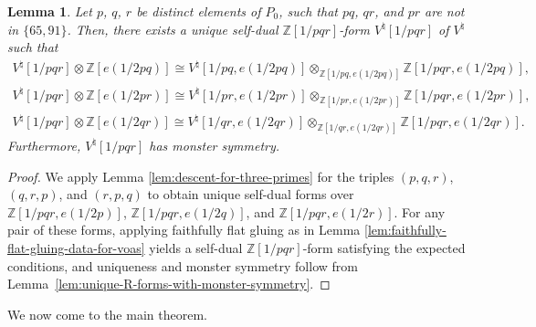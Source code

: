 \documentclass[pdftex]{sigma}
\newcommand{\bZ}{\mathbb{Z}}
\newtheorem{lem}[thm]{Lemma}
\theoremstyle{definition}
\begin{document}
\begin{lem} \label{lem:descent-for-triangle}Let $p$, $q$, $r$ be distinct elements of $P_0$, such that $pq$, $qr$, and $pr$ are not in $\{65, 91 \}$. Then, there exists a unique self-dual $\bZ[1/pqr]$-form $V^\natural[1/pqr]$ of $V^\natural$ such that
 \begin{gather*}
V^\natural[1/pqr] \otimes \bZ[e(1/2pq)] \cong V^\natural[1/pq, e(1/2pq)] \otimes_{\bZ[1/pq, e(1/2pq)]} \bZ[1/pqr, e(1/2pq)], \\
V^\natural[1/pqr] \otimes \bZ[e(1/2pr)]\cong V^\natural[1/pr, e(1/2pr)] \otimes_{\bZ[1/pr, e(1/2pr)]} \bZ[1/pqr, e(1/2pr)], \\
V^\natural[1/pqr] \otimes \bZ[e(1/2qr)]\cong V^\natural[1/qr, e(1/2qr)] \otimes_{\bZ[1/qr, e(1/2qr)]} \bZ[1/pqr, e(1/2qr)].
\end{gather*}
Furthermore, $V^\natural[1/pqr]$ has monster symmetry.
\end{lem}
\begin{proof}We apply Lemma \ref{lem:descent-for-three-primes} for the triples $(p,q,r)$, $(q,r,p)$, and $(r,p,q)$ to obtain unique self-dual forms over $\bZ[1/pqr, e(1/2p)]$, $\bZ[1/pqr, e(1/2q)]$, and $\bZ[1/pqr, e(1/2r)]$. For any pair of these forms, applying faithfully flat gluing as in Lemma \ref{lem:faithfully-flat-gluing-data-for-voas} yields a self-dual $\bZ[1/pqr]$-form satisfying the expected conditions, and uniqueness and monster symmetry follow from Lemma~\ref{lem:unique-R-forms-with-monster-symmetry}.
\end{proof}

We now come to the main theorem.
\end{document}
